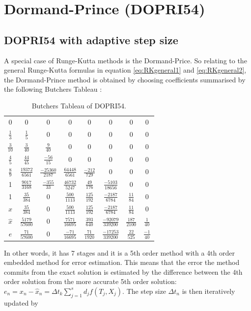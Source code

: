 \section{Dormand-Prince (DOPRI54)}
\subsection{DOPRI54 with adaptive step size}
A special case of Runge-Kutta methods is the Dormand-Price. So relating to the general Runge-Kutta formulas in equation \ref{eq:RKgeneral1} and \ref{eq:RKgeneral2}, the Dormand-Prince method is obtained by choosing coefficients summarised by the following Butchers Tableau \cite{JrgensenRunge-KuttaEquations}:

\begin{table}[H]
\centering
\begin{tabular}{c|ccccccc}
0 & 0 & 0 & 0 & 0 & 0 & 0 & 0 \\
$\frac{1}{3}$ & $\frac{1}{5}$ & 0 & 0 & 0 & 0 & 0 & 0 \\
$\frac{3}{10}$ & $\frac{3}{40}$ & $\frac{9}{40}$ & 0 & 0 & 0 & 0 & 0 \\
$\frac{4}{5}$ & $\frac{44}{45}$ & $\frac{-56}{15}$ & 0 & 0 & 0 & 0 & 0 \\
$\frac{8}{9}$ & $\frac{19372}{6561}$ & $\frac{-25360}{2187}$ & $\frac{64448}{6561}$ & $\frac{-212}{729}$ & 0 & 0 & 0 \\
1 & $\frac{9017}{3168}$ & $\frac{-355}{33}$ & $\frac{46732}{5247}$ & $\frac{49}{176}$ & $\frac{-5103}{18656}$ & 0 & 0 \\
1 & $\frac{35}{384}$ & 0 & $\frac{500}{1113}$ & $\frac{125}{192}$ & $\frac{-2187}{6784}$ & $\frac{11}{84}$ & 0 \\ \hline
 $x$ &  $\frac{35}{384}$ & 0 & $\frac{500}{1113}$ & $\frac{125}{192}$ & $\frac{-2187}{6784}$ & $\frac{11}{84}$ & 0  \\
$\hat{x}$ & $\frac{5179}{57600}$ & 0 & $\frac{7571}{16695}$ & $\frac{393}{640}$ & $\frac{-92079}{339200}$ & $\frac{187}{2100}$ & $\frac{1}{40}$ \\ \hline
$e$ & $\frac{71}{57600}$ & 0 & $\frac{-71}{16695}$ & $\frac{71}{1920}$ & $\frac{-17253}{339200}$ & $\frac{22}{525}$ & $\frac{-1}{40}$
\end{tabular}
\label{tab:DOPRI54}
\caption{Butchers Tableau of DOPRI54.}
\end{table}

In other words, it has 7 stages and it is a 5th order method with a 4th order embedded method for error estimation. This means that the error the method commits from the exact solution is estimated by the difference between the 4th order solution from the more accurate 5th order solution: $e_n = x_n - \hat{x}_n = \Delta t_k \sum_{j=1}^{s} d_{j} f\left(T_{j}, X_{j}\right)$. The step size $\Delta t_n$ is then iteratively updated by

